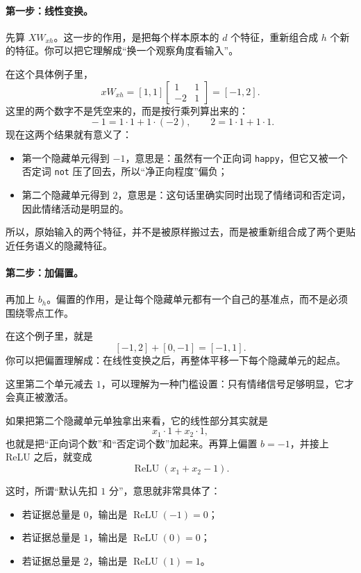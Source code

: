 \documentclass[12pt,a4paper]{ctexart}
\begin{document}
\paragraph{第一步：线性变换。}
先算 \(XW_{xh}\)。这一步的作用，是把每个样本原本的 \(d\) 个特征，重新组合成 \(h\) 个新的特征。你可以把它理解成“换一个观察角度看输入”。

在这个具体例子里，
\[
xW_{xh}
=
[1,1]
\begin{bmatrix}
1 & 1\\
-2 & 1
\end{bmatrix}
=
[-1,2].
\]
这里的两个数字不是凭空来的，而是按行乘列算出来的：
\[
\;-1 = 1\cdot 1 + 1\cdot (-2),
\qquad
2 = 1\cdot 1 + 1\cdot 1.
\]
现在这两个结果就有意义了：
\begin{itemize}
  \item 第一个隐藏单元得到 \(-1\)，意思是：虽然有一个正向词 \texttt{happy}，但它又被一个否定词 \texttt{not} 压了回去，所以“净正向程度”偏负；
  \item 第二个隐藏单元得到 \(2\)，意思是：这句话里确实同时出现了情绪词和否定词，因此情绪活动是明显的。
\end{itemize}
所以，原始输入的两个特征，并不是被原样搬过去，而是被重新组合成了两个更贴近任务语义的隐藏特征。

\paragraph{第二步：加偏置。}
再加上 \(b_h\)。偏置的作用，是让每个隐藏单元都有一个自己的基准点，而不是必须围绕零点工作。

在这个例子里，就是
\[
[-1,2] + [0,-1] = [-1,1].
\]
你可以把偏置理解成：在线性变换之后，再整体平移一下每个隐藏单元的起点。

这里第二个单元减去 \(1\)，可以理解为一种门槛设置：只有情绪信号足够明显，它才会真正被激活。

如果把第二个隐藏单元单独拿出来看，它的线性部分其实就是
\[
x_1\cdot 1 + x_2\cdot 1,
\]
也就是把“正向词个数”和“否定词个数”加起来。再算上偏置 \(b=-1\)，并接上 ReLU 之后，就变成
\[
\operatorname{ReLU}(x_1 + x_2 - 1).
\]

这时，所谓“默认先扣 \(1\) 分”，意思就非常具体了：
\begin{itemize}
  \item 若证据总量是 \(0\)，输出是 \(\operatorname{ReLU}(-1)=0\)；
  \item 若证据总量是 \(1\)，输出是 \(\operatorname{ReLU}(0)=0\)；
  \item 若证据总量是 \(2\)，输出是 \(\operatorname{ReLU}(1)=1\)。
\end{itemize}
\end{document}
